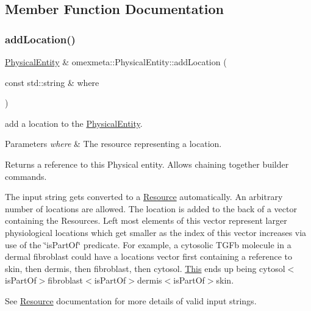 \subsection{Member Function Documentation}
\mbox{\label{classomexmeta_1_1PhysicalEntity_a82e77be3327c537b2426b571afaa5045}} 
\subsubsection{\texorpdfstring{add\+Location()}{addLocation()}}
{\footnotesize\ttfamily \hyperlink{classomexmeta_1_1PhysicalEntity}{Physical\+Entity} \& omexmeta\+::\+Physical\+Entity\+::add\+Location (\begin{DoxyParamCaption}\item[{const std\+::string \&}]{where }\end{DoxyParamCaption})}



add a location to the \hyperlink{classomexmeta_1_1PhysicalEntity}{Physical\+Entity}. 


\begin{DoxyParams}{Parameters}
{\em where} & The resource representing a location. \\
\hline
\end{DoxyParams}
\begin{DoxyReturn}{Returns}
a reference to this Physical entity. Allows chaining together builder commands.
\end{DoxyReturn}
The input string gets converted to a \hyperlink{classomexmeta_1_1Resource}{Resource} automatically. An arbitrary number of locations are allowed. The location is added to the back of a vector containing the Resources. Left most elements of this vector represent larger physiological locations which get smaller as the index of this vector increases via use of the \char`\"{}is\+Part\+Of\char`\"{} predicate. For example, a cytosolic T\+G\+Fb molecule in a dermal fibroblast could have a locations vector first containing a reference to skin, then dermis, then fibroblast, then cytosol. \hyperlink{classThis}{This} ends up being cytosol$<$is\+Part\+Of$>$fibroblast$<$is\+Part\+Of$>$dermis$<$is\+Part\+Of$>$skin.

See \hyperlink{classomexmeta_1_1Resource}{Resource} documentation for more details of valid input strings. \mbox{\label{classomexmeta_1_1PhysicalEntity_a6fd4acd7255a01322c4a53d3e84df0ba}} 
